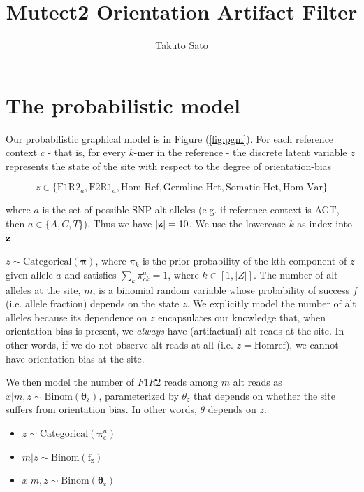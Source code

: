 \documentclass[a4paper]{article}
\title{Mutect2 Orientation Artifact Filter}
\author{Takuto Sato}
\newcommand{\vz}{{\bf z}}
\newcommand{\vpi}{{\bm \pi}}
\newcommand{\vtheta}{{\bm \theta}}
\begin{document}
\maketitle

\section{The probabilistic model}

Our probabilistic graphical model is in Figure (\ref{fig:pgm}). For each reference context $c$ - that is, for every $k$-mer in the reference - the discrete latent variable $z$ represents the state of the site with respect to the degree of orientation-bias 

\begin{equation*}
z \in \{ \text{F1R2}_a, \text{F2R1}_a, \text{Hom Ref}, \text{Germline Het}, \text{Somatic Het}, \text{Hom Var} \}
\end{equation*}

where $a$ is the set of possible SNP alt alleles (e.g. if reference context is AGT, then $a \in \{ A, C, T \}$). Thus we have $|\vz| = 10$. We use the lowercase $k$ as index into $\vz$.

$z \sim \mathrm{Categorical}(\vpi)$, where $\pi_{k}$ is the prior probability of the kth component of $z$ given allele $a$ and satisfies $\sum_k \pi^a_{ck} = 1$, where $k \in [1, |Z|]$. The number of alt alleles at the site, $m$, is a binomial random variable whose probability of success $f$ (i.e. allele fraction) depends on the state $z$. We explicitly model the number of alt alleles because its dependence on $z$ encapsulates our knowledge that, when orientation bias is present, we \textit{always} have (artifactual) alt reads at the site. In other words, if we do not observe alt reads at all (i.e. $z = \mathrm{Hom ref}$), we cannot have orientation bias at the site. 

We then model the number of $F1R2$ reads among $m$ alt reads as $x|m,z \sim \mathrm{Binom(\vtheta_z)}$, parameterized by $\theta_z$ that depends on whether the site suffers from orientation bias. In other words, $\theta$ depends on $z$. 

\begin{itemize}
\item $z \sim \mathrm{Categorical}(\vpi^a_c)$
\item $m | z \sim \mathrm{Binom(f_z)}$
\item $x | m,z \sim \mathrm{Binom(\vtheta_z)}$
\end{itemize}
\end{document}
